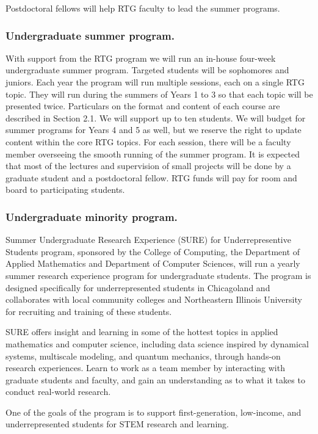 \documentclass[11pt]{NSFamsart}
\begin{document}
Postdoctoral fellows will help RTG faculty to lead the   summer programs.

 \noindent
\subsubsection*{Undergraduate summer program.}
With support from the RTG program we will run an in-house four-week undergraduate summer program.
Targeted students will be sophomores and juniors. Each year the program will run multiple sessions, each on a single RTG topic. They will run during the summers of Years 1 to 3 so that each topic
will be presented twice. Particulars on the format and content of each course are described in Section 2.1.
We will support up to ten students. We will budget for summer programs for Years 4 and 5 as well, but we reserve
the right to update content within the core RTG topics. For each session, there will be a faculty member
  overseeing the smooth running of the summer program. It is expected that most of the lectures
and supervision of small projects will be done by a graduate student and a postdoctoral fellow. RTG funds
will pay for room and board to participating students.


\subsubsection*{Undergraduate minority program.} Summer Undergraduate Research Experience (SURE) for Underrepresentive Students program,   
sponsored by the College of Computing, the Department of Applied
Mathematics and Department of Computer Sciences, will run a yearly
summer research experience program for undergraduate students.
The program is designed specifically for underrepresented students in Chicagoland and 
  collaborates with local community colleges and Northeastern Illinois University for recruiting
and training of these students.

SURE offers insight and learning in some of the hottest topics in
applied mathematics and computer science, including data science inspired by dynamical systems, multiscale modeling, and quantum mechanics,   through hands-on research
experiences. Learn to work as a team member by interacting with graduate
students and faculty, and gain an understanding as to what it takes to
conduct real-world research.

One of the goals of the program is to support first-generation,
low-income, and underrepresented students for STEM research and learning.
\end{document}
